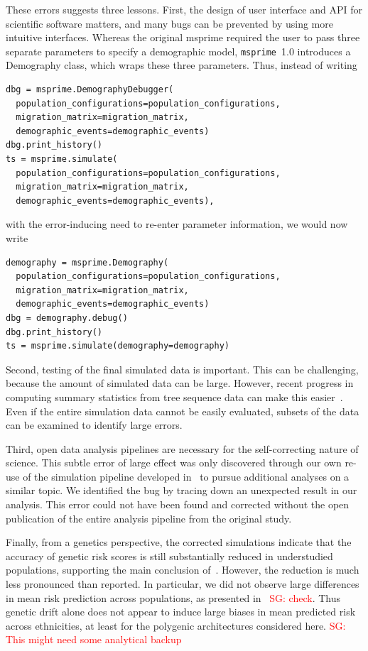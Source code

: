 \documentclass{article}
\newcommand{\msprime}[0]{\texttt{msprime}}
\newcommand{\sgcomment}[1]{{\textcolor{red}{SG: #1}}}
\begin{document}
These errors suggests three lessons.
First, the design of user interface and API for scientific software matters,
and many bugs can be prevented by using more intuitive 
interfaces. Whereas the original msprime required the user to pass
three separate parameters to specify a demographic model, \msprime\ 1.0
 introduces a Demography class, which wraps these three parameters.
Thus, instead of writing
\begin{lstlisting}[frame=single]
dbg = msprime.DemographyDebugger(
  population_configurations=population_configurations,
  migration_matrix=migration_matrix,
  demographic_events=demographic_events)
dbg.print_history()
ts = msprime.simulate(
  population_configurations=population_configurations,
  migration_matrix=migration_matrix,
  demographic_events=demographic_events),
\end{lstlisting}
with the error-inducing need to re-enter parameter information,  
we would now write
\begin{lstlisting}[frame=single]
demography = msprime.Demography(
  population_configurations=population_configurations,
  migration_matrix=migration_matrix,
  demographic_events=demographic_events)
dbg = demography.debug()
dbg.print_history()
ts = msprime.simulate(demography=demography)
\end{lstlisting}

Second, testing of the final simulated data is important. This can be challenging,
because the amount of simulated data can be large. However, recent progress in
computing summary statistics from tree sequence data can make this
easier~\citep{ralph2020efficiently}.
Even if the entire simulation data cannot be easily evaluated, subsets of the data
can be examined to identify large errors.

Third, open data analysis pipelines are necessary for the self-correcting nature of science.
This subtle error of large effect was only discovered through our own re-use of
the simulation pipeline developed in~\citep{martin2017human} to pursue
additional analyses on a similar topic. We identified the bug by tracing down an unexpected
result in our analysis. This error could not have been found and corrected without the open
publication of the entire analysis pipeline from the original study.

Finally, from a genetics perspective, the corrected simulations indicate that the accuracy of genetic risk scores
is still substantially reduced in understudied populations, supporting the main conclusion of~\citep{martin2017human}. 
However, the reduction is much less pronounced than reported. In particular, we did not observe large
differences in mean risk prediction across populations, as presented in~\citep{martin2017human} \sgcomment{check}.
Thus genetic drift alone does not appear to induce large biases in mean predicted risk across ethnicities, at least for 
the polygenic architectures considered here. \sgcomment{This might need some analytical backup} 
\end{document}
